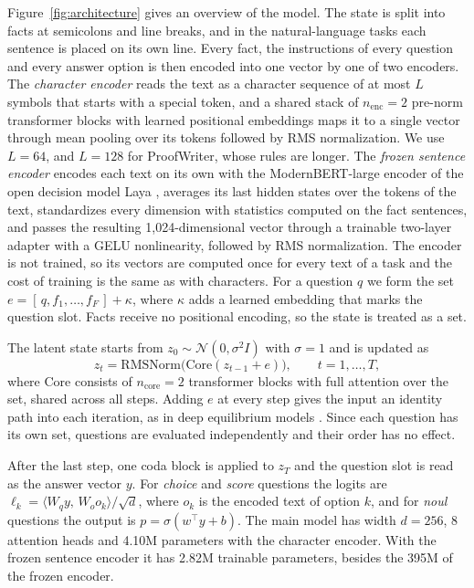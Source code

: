 \documentclass{article}
\begin{document}
Figure~\ref{fig:architecture} gives an overview of the model. The state is split into facts at semicolons and line breaks, and in the natural-language tasks each sentence is placed on its own line. Every fact, the instructions of every question and every answer option is then encoded into one vector by one of two encoders. The \emph{character encoder} reads the text as a character sequence of at most $L$ symbols that starts with a special token, and a shared stack of $n_{\text{enc}} = 2$ pre-norm transformer blocks with learned positional embeddings maps it to a single vector through mean pooling over its tokens followed by RMS normalization. We use $L = 64$, and $L = 128$ for ProofWriter, whose rules are longer. The \emph{frozen sentence encoder} encodes each text on its own with the ModernBERT-large encoder of the open decision model Laya \cite{convai2026laya, warner2024modernbert}, averages its last hidden states over the tokens of the text, standardizes every dimension with statistics computed on the fact sentences, and passes the resulting 1{,}024-dimensional vector through a trainable two-layer adapter with a GELU nonlinearity, followed by RMS normalization. The encoder is not trained, so its vectors are computed once for every text of a task and the cost of training is the same as with characters. For a question $q$ we form the set $e = [\,q, f_1, \dots, f_F\,] + \kappa$, where $\kappa$ adds a learned embedding that marks the question slot. Facts receive no positional encoding, so the state is treated as a set.

The latent state starts from $z_0 \sim \mathcal{N}(0, \sigma^2 I)$ with $\sigma = 1$ and is updated as
\begin{equation}
z_t = \mathrm{RMSNorm}\big(\mathrm{Core}(z_{t-1} + e)\big), \qquad t = 1, \dots, T,
\label{eq:recurrence}
\end{equation}
where $\mathrm{Core}$ consists of $n_{\text{core}} = 2$ transformer blocks with full attention over the set, shared across all steps. Adding $e$ at every step gives the input an identity path into each iteration, as in deep equilibrium models \cite{bai2019deq}. Since each question has its own set, questions are evaluated independently and their order has no effect.

After the last step, one coda block is applied to $z_T$ and the question slot is read as the answer vector $y$. For \emph{choice} and \emph{score} questions the logits are $\ell_k = \langle W_q y,\, W_o o_k\rangle / \sqrt{d}$, where $o_k$ is the encoded text of option $k$, and for \emph{noul} questions the output is $p = \sigma(w^\top y + b)$. The main model has width $d = 256$, 8 attention heads and 4.10M parameters with the character encoder. With the frozen sentence encoder it has 2.82M trainable parameters, besides the 395M of the frozen encoder.
\end{document}
